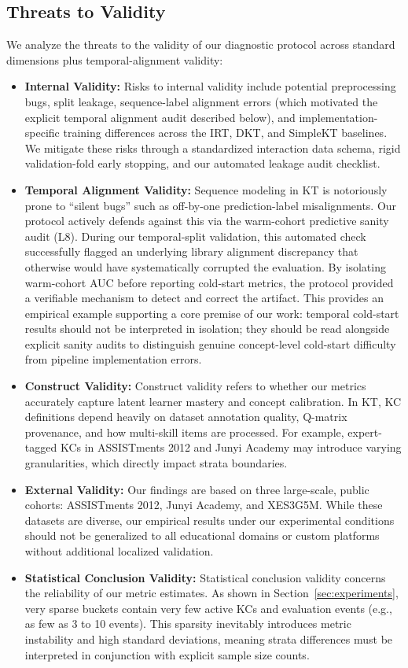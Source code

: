 \subsection{Threats to Validity}
\label{sec:threats}
We analyze the threats to the validity of our diagnostic protocol across standard dimensions plus temporal-alignment validity:
\begin{itemize}
    \item \textbf{Internal Validity:} Risks to internal validity include potential preprocessing bugs, split leakage, sequence-label alignment errors (which motivated the explicit temporal alignment audit described below), and implementation-specific training differences across the IRT, DKT, and SimpleKT baselines. We mitigate these risks through a standardized interaction data schema, rigid validation-fold early stopping, and our automated leakage audit checklist.
    \item \textbf{Temporal Alignment Validity:} Sequence modeling in KT is notoriously prone to ``silent bugs'' such as off-by-one prediction-label misalignments. Our protocol actively defends against this via the warm-cohort predictive sanity audit (L8). During our temporal-split validation, this automated check successfully flagged an underlying library alignment discrepancy that otherwise would have systematically corrupted the evaluation. By isolating warm-cohort AUC before reporting cold-start metrics, the protocol provided a verifiable mechanism to detect and correct the artifact. This provides an empirical example supporting a core premise of our work: temporal cold-start results should not be interpreted in isolation; they should be read alongside explicit sanity audits to distinguish genuine concept-level cold-start difficulty from pipeline implementation errors.
    \item \textbf{Construct Validity:} Construct validity refers to whether our metrics accurately capture latent learner mastery and concept calibration. In KT, KC definitions depend heavily on dataset annotation quality, Q-matrix provenance, and how multi-skill items are processed. For example, expert-tagged KCs in ASSISTments 2012 and Junyi Academy may introduce varying granularities, which directly impact strata boundaries.
    \item \textbf{External Validity:} Our findings are based on three large-scale, public cohorts: ASSISTments 2012, Junyi Academy, and XES3G5M. While these datasets are diverse, our empirical results under our experimental conditions should not be generalized to all educational domains or custom platforms without additional localized validation.
    \item \textbf{Statistical Conclusion Validity:} Statistical conclusion validity concerns the reliability of our metric estimates. As shown in Section~\ref{sec:experiments}, very sparse buckets contain very few active KCs and evaluation events (e.g., as few as 3 to 10 events). This sparsity inevitably introduces metric instability and high standard deviations, meaning strata differences must be interpreted in conjunction with explicit sample size counts.
\end{itemize}
